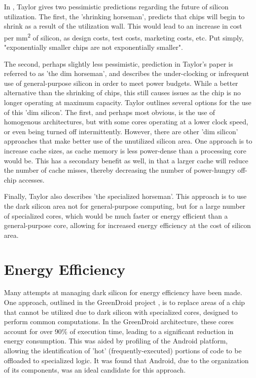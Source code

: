 \documentclass{UoYCSproject}
\begin{document}
In \cite{four-horsemen}, Taylor gives two pessimistic predictions regarding the future of silicon
utilization. The first, the 'shrinking horseman', predicts that chips will begin to shrink as a result of
the utilization wall. This would lead to an increase in cost per mm\textsuperscript{2} of silicon, as
design costs, test costs, marketing costs, etc. Put simply, "exponentially smaller chips are not
exponentially smaller".

The second, perhaps slightly less pessimistic, prediction in Taylor's paper
is referred to as 'the dim horseman', and describes the under-clocking or infrequent use of
general-purpose silicon in order to meet power budgets. While a better alternative than the shrinking
of chips, this still causes issues as the chip is no longer operating at maximum capacity.
Taylor outlines several options for the use of this 'dim silicon'. The first, and perhaps most obvious,
is the use of homogenous architectures, but with some cores operating at a lower clock speed, or
even being turned off intermittently. However, there are other 'dim silicon' approaches that make better
use of the unutilized silicon area. One approach is to increase cache sizes, as cache memory is less
power-dense than a processing core would be. This has a secondary benefit as well, in that a larger
cache will reduce the number of cache misses, thereby decreasing the number of power-hungry off-chip
accesses.

Finally, Taylor also describes 'the specialized horseman'. This approach is to use the dark silicon area
not for general-purpose computing, but for a large number of specialized cores, which would be much
faster or energy efficient than a general-purpose core, allowing for increased energy efficiency at the
cost of silicon area.

\section{Energy Efficiency}

Many attempts at managing dark silicon for energy efficiency have been made. One approach, outlined in the
GreenDroid project \cite{greendroid}, is to replace areas of a chip that cannot be utilized due to dark
silicon with specialized cores, designed to perform common computations. In the GreenDroid architecture,
these cores account for over 90\% of execution time, leading to a significant reduction in energy
consumption. This was aided by profiling of the Android platform, allowing the identification of 'hot'
(frequently-executed) portions of code to be offloaded to specialized logic. It was found that Android,
due to the organization of its components, was an ideal candidate for this approach.
\end{document}
